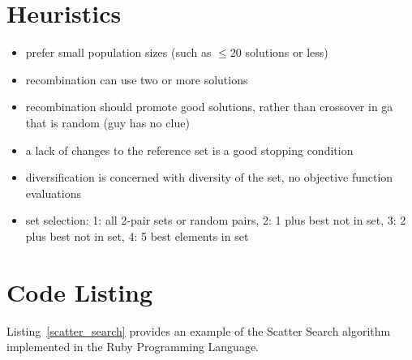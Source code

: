 \documentclass[a4paper, 11pt]{article}
\begin{document}
\section{Heuristics}
\label{sec:heuristics}
\begin{itemize}
	\item prefer small population sizes (such as  $\leq 20$ solutions or less)
	\item recombination can use two or more solutions
	\item recombination should promote good solutions, rather than crossover in ga that is random (guy has no clue)
	\item a lack of changes to the reference set is a good stopping condition
	\item diversification is concerned with diversity of the set, no objective function evaluations
	\item set selection: 1: all 2-pair sets or random pairs, 2: 1 plus best not in set, 3: 2 plus best not in set, 4: 5 best elements in set
\end{itemize}

\section{Code Listing}
\label{sec:code}
Listing~\ref{scatter_search} provides an example of the Scatter Search algorithm implemented in the Ruby Programming Language. 
\end{document}
